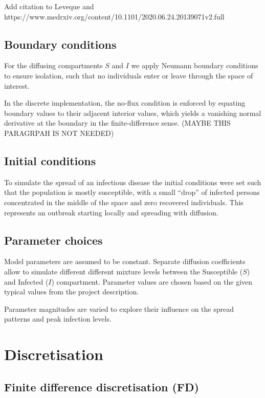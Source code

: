 \documentclass[
  letterpaper,
  DIV=11,
  numbers=noendperiod]{scrartcl}
\begin{document}
Add citation to Leveque and
https://www.medrxiv.org/content/10.1101/2020.06.24.20139071v2.full

\subsection{Boundary conditions}\label{boundary-conditions}

For the diffusing compartments \(S\) and \(I\) we apply Neumann boundary
conditions to ensure isolation, such that no individuals enter or leave
through the space of interest.

In the discrete implementation, the no-flux condition is enforced by
equating boundary values to their adjacent interior values, which yields
a vanishing normal derivative at the boundary in the finite-difference
sense. (MAYBE THIS PARAGRPAH IS NOT NEEDED)

\subsection{Initial conditions}\label{initial-conditions}

To simulate the spread of an infectious disease the initial conditions
were set such that the population is mostly susceptible, with a small
``drop'' of infected persons concentrated in the middle of the space and
zero recovered individuals. This represents an outbreak starting locally
and spreading with diffusion.

\subsection{Parameter choices}\label{parameter-choices}

Model parameters are assumed to be constant. Separate diffusion
coefficients allow to simulate different different mixture levels
between the Susceptible (\(S\)) and Infected (\(I\)) compartment.
Parameter values are chosen based on the given typical values from the
project description.

Parameter magnitudes are varied to explore their influence on the spread
patterns and peak infection levels.

\section{Discretisation}\label{discretisation}

\subsection{Finite difference discretisation
(FD)}\label{finite-difference-discretisation-fd}
\end{document}
